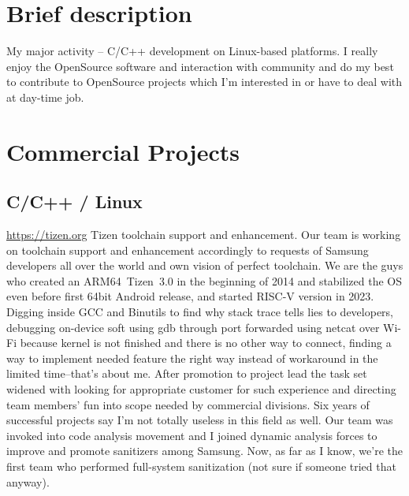 \documentclass[11pt,a4paper]{moderncv}
\begin{document}
\maketitle

\section{Brief description}
\cvitem {} {My major activity -- C/C++ development on Linux-based platforms.\newline{} I really enjoy the OpenSource
  software and interaction with community and do my best to contribute to OpenSource projects which I'm interested in or
  have to deal with at day-time job.}
\section{Commercial Projects}
  \subsection{C/C++ / Linux}
  {\url{https://tizen.org}\newline{}
    Tizen toolchain support and enhancement.\newline{}
    Our team is working on toolchain support and enhancement accordingly to requests of Samsung developers all over the
    world and own vision of perfect toolchain. We are the guys who created an ARM64~Tizen~3.0 in the beginning of 2014
    and stabilized the OS even before first 64bit Android release, and started RISC-V version in 2023.\newline{}
    Digging inside GCC and Binutils to find why stack trace tells lies to developers, debugging on-device soft using gdb
    through port forwarded using netcat over Wi-Fi because kernel is not finished and there is no other way to connect,
    finding a way to implement needed feature the right way instead of workaround in the limited time--that's about me.
    \newline{}
    After promotion to project lead the task set widened with looking for appropriate customer for such experience
    and directing team members' fun into scope needed by commercial divisions. Six years of successful projects say
    I'm not totally useless in this field as well.\newline{}
    Our team was invoked into code analysis movement and I joined dynamic analysis forces to improve and promote sanitizers
    among Samsung. Now, as far as I know, we're the first team who performed full-system sanitization (not sure if someone
    tried that anyway).
  }
\end{document}
